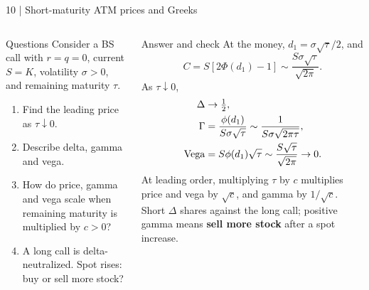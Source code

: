 \documentclass[handout,10pt,t,aspectratio=169]{beamer}
\newenvironment{questions}{\begin{block}{Questions}}{\end{block}}
\newenvironment{answers}{\begin{exampleblock}{Answer and check}}{\end{exampleblock}}
\newcommand{\compact}{\small%
 \setlength{\abovedisplayskip}{3pt}%
 \setlength{\belowdisplayskip}{3pt}%
 \setlength{\abovedisplayshortskip}{2pt}%
 \setlength{\belowdisplayshortskip}{2pt}%
 \setlength{\parskip}{2pt}}
\begin{document}
\begin{frame}{10 | Short-maturity ATM prices and Greeks}
\compact
\begin{columns}[T,onlytextwidth]
\begin{questions}
Consider a BS call with \(r=q=0\), current \(S=K\), volatility \(\sigma>0\),
and remaining maturity \(\tau\).
\begin{enumerate}
\item Find the leading price as \(\tau\downarrow0\).
\item Describe delta, gamma and vega.
\item How do price, gamma and vega scale when remaining maturity is multiplied by \(c>0\)?
\item A long call is delta-neutralized. Spot rises: buy or sell more stock?
\end{enumerate}
\end{questions}
\begin{answers}
At the money, \(d_1=\sigma\sqrt\tau/2\), and
\[
 C=S[2\Phi(d_1)-1]\sim\frac{S\sigma\sqrt\tau}{\sqrt{2\pi}}.
\]
As \(\tau\downarrow0\),
\[
 \begin{aligned}
 \Delta&\to\tfrac12,\\
 \Gamma&=\frac{\phi(d_1)}{S\sigma\sqrt\tau}
       \sim\frac1{S\sigma\sqrt{2\pi\tau}},\\
 {\rm Vega}&=S\phi(d_1)\sqrt\tau
       \sim\frac{S\sqrt\tau}{\sqrt{2\pi}}\to0.
 \end{aligned}
\]
At leading order, multiplying \(\tau\) by \(c\) multiplies price and vega by \(\sqrt c\), and gamma by \(1/\sqrt c\).
Short \(\Delta\) shares against the long call; positive gamma means
\textbf{sell more stock} after a spot increase.
\end{answers}
\end{columns}
\end{frame}
\end{document}
